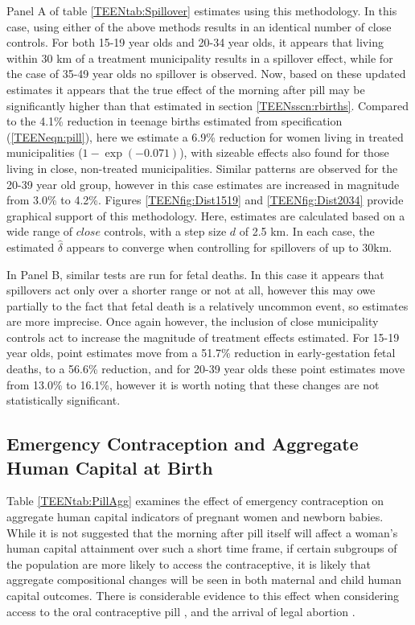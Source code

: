 Panel A of table \ref{TEENtab:Spillover} estimates using this methodology.  In
this case, using either of the above methods results in an identical number of 
close controls.  For both 15-19 year olds and 20-34 year olds, it appears that
living within 30 km of a treatment municipality results in a spillover effect,
while for the case of 35-49 year olds no spillover is observed.  Now, based on
these updated estimates it appears that the true effect of the morning after 
pill may be significantly higher than that estimated in section 
\ref{TEENsscn:rbirths}.  Compared to the 4.1\% reduction in teenage births 
estimated from specification (\ref{TEENeqn:pill}), here we estimate a 6.9\% 
reduction for women living in treated municipalities ($1-\exp(-0.071)$), with
sizeable effects also found for those living in close, non-treated 
municipalities.  Similar patterns are observed for the 20-39 year old group,
however in this case estimates are increased in magnitude from 3.0\% to 4.2\%.
Figures \ref{TEENfig:Dist1519} and \ref{TEENfig:Dist2034} provide graphical
support of this methodology.  Here, estimates are calculated based on a wide
range of $close$ controls, with a step size $d$  of 2.5 km.  In each case,
the estimated $\hat\delta$ appears to converge when controlling for spillovers
of up to 30km.

In Panel B, similar tests are run for fetal deaths.  In this case it appears 
that spillovers act only over a shorter range or not at all, however this may 
owe partially to the fact that fetal death is a relatively uncommon event, so 
estimates are more imprecise.  Once again however, the inclusion of close 
municipality controls act to increase the magnitude of treatment effects 
estimated.  For 15-19 year olds, point estimates move from a 51.7\% reduction 
in early-gestation fetal deaths, to a 56.6\% reduction, and for 20-39 year olds
these point estimates move from 13.0\% to 16.1\%, however it is worth noting 
that these changes are not statistically significant.

\subsection{Emergency Contraception and Aggregate Human Capital at Birth}
Table \ref{TEENtab:PillAgg} examines the effect of emergency contraception on
aggregate human capital indicators of pregnant women and newborn babies.  While
it is not suggested that the morning after pill itself will affect a woman's
human capital attainment over such a short time frame, if certain subgroups of 
the population are more likely to access the contraceptive, it is likely that 
aggregate compositional changes will be seen in both maternal and child human 
capital outcomes.  There is considerable evidence to this effect when considering 
access to the oral contraceptive pill \citep{Baileyetal2012,OltmansHungerman2012,
ChiapporiOreffice2008}, and the arrival of legal abortion \citep{Whitaker2011,
Ananatetal2009}.

